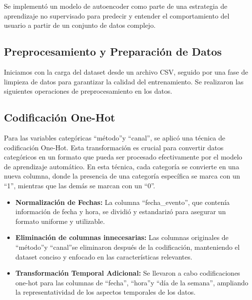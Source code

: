 Se implementó un modelo de autoencoder como parte de una estrategia de aprendizaje no supervisado para predecir y entender el comportamiento del usuario a partir de un conjunto de datos complejo.

\subsection{Preprocesamiento y Preparación de Datos}

Iniciamos con la carga del dataset desde un archivo CSV, seguido por una fase de limpieza de datos para garantizar la calidad del entrenamiento. Se realizaron las siguientes operaciones de preprocesamiento en los datos.

\subsection{Codificación One-Hot}

Para las variables categóricas \textquotedblleft método\textquotedblright y \textquotedblleft canal\textquotedblright, se aplicó una técnica de codificación One-Hot. Esta transformación es crucial para convertir datos categóricos en un formato que pueda ser procesado efectivamente por el modelo de aprendizaje automático. En esta técnica, cada categoría se convierte en una nueva columna, donde la presencia de una categoría específica se marca con un \textquotedblleft 1\textquotedblright, mientras que las demás se marcan con un \textquotedblleft 0\textquotedblright.

\begin{itemize}
    \item \textbf{Normalización de Fechas:} La columna \textquotedblleft fecha\_evento\textquotedblright, que contenía información de fecha y hora, se dividió y estandarizó para asegurar un formato uniforme y utilizable.
    \item \textbf{Eliminación de columnas innecesarias:} Las columnas originales de \textquotedblleft método\textquotedblright y \textquotedblleft canal\textquotedblright se eliminaron después de la codificación, manteniendo el dataset conciso y enfocado en las características relevantes.
    \item \textbf{Transformación Temporal Adicional:} Se llevaron a cabo codificaciones one-hot para las columnas de \textquotedblleft fecha\textquotedblright, \textquotedblleft hora\textquotedblright y \textquotedblleft día de la semana\textquotedblright, ampliando la representatividad de los aspectos temporales de los datos.
\end{itemize}

